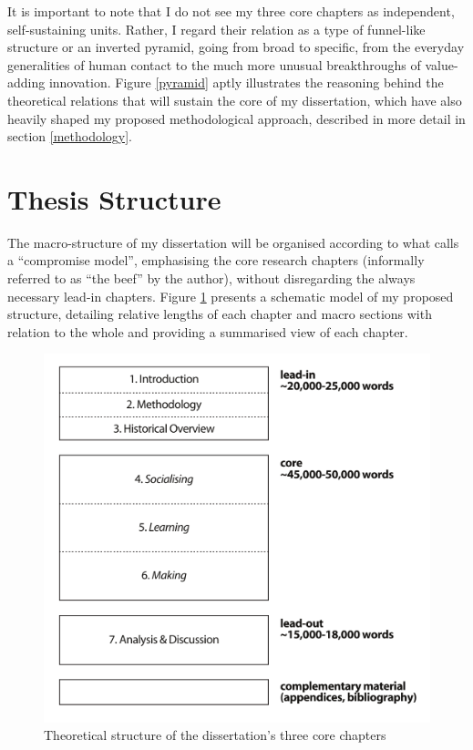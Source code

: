 It is important to note that I do not see my three core chapters as independent, self-sustaining units. Rather, I regard their relation as a type of funnel-like structure or an inverted pyramid, going from broad to specific, from the everyday generalities of human contact to the much more unusual breakthroughs of value-adding innovation. Figure \ref{pyramid} aptly illustrates the reasoning behind the theoretical relations that will sustain the core of my dissertation, which have also heavily shaped my proposed methodological approach, described in more detail in section \ref{methodology}.

\newpage


 

\section{Thesis Structure}
\label{structure}

The macro-structure of my dissertation will be organised according to what \citet{dunleavy03} calls a ``compromise model'', emphasising the core research chapters (informally referred to as ``the beef'' by the author), without disregarding the always necessary lead-in chapters. Figure \ref{structure-graph} presents a schematic model of my proposed structure, detailing relative lengths of each chapter and macro sections with relation to the whole and providing a summarised view of each chapter.

\begin{figure}[ht]
	\centering
		\includegraphics[scale=0.65,natwidth=10pt,natheight=1pt]{confirmation-report/graphs/structure01.pdf}
	\caption[Thesis Structure]{Theoretical structure of the dissertation's three core chapters}
	\label{structure-graph}
\end{figure}



